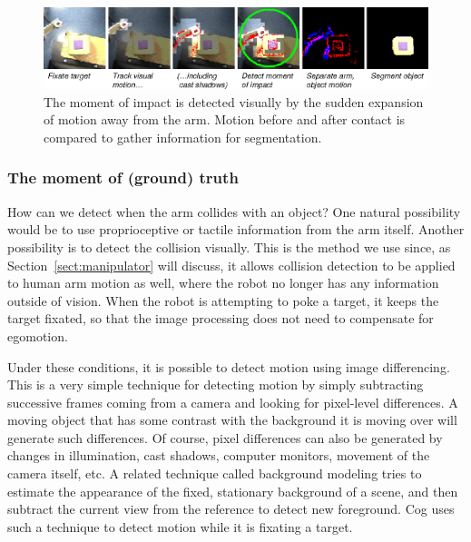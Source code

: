 
\begin{figure}[tbh]
  \begin{center}
\includegraphics[width=\columnwidth]{fig-poke-zoom.eps}
  \end{center}
  \caption{
  \label{fig:poke-zoom}
    The moment of impact is detected visually by the
    sudden expansion of motion away from the arm.  Motion before and
    after contact is compared to gather information for segmentation.
}
\end{figure}


\subsubsection*{The moment of (ground) truth}

How can we detect when the arm collides with an object?  One natural
possibility would be to use proprioceptive or tactile information from
the arm itself.  Another possibility is to detect the collision
visually.  This is the method we use since, as
Section~\ref{sect:manipulator} will discuss, it allows collision
detection to be applied to human arm motion as well, where the robot
no longer has any information outside of vision.  When the robot 
is attempting to poke a target, it keeps the target fixated,
so that the image processing does not need to compensate for
egomotion.

Under these conditions, it is possible to detect motion using
image differencing.
This is a very simple technique for detecting motion by
simply subtracting successive frames coming from a camera and looking for
pixel-level differences.  A moving object that has some contrast with
the background it is moving over will generate such differences.  Of
course, pixel differences can also be generated by changes in
illumination, cast shadows, computer monitors, movement of the camera
itself, etc.  A related technique called background modeling tries to
estimate the appearance of the fixed, stationary background of a 
scene, and then subtract the current view from the reference to 
detect new foreground.  Cog uses such a technique to detect motion
while it is fixating a target.

